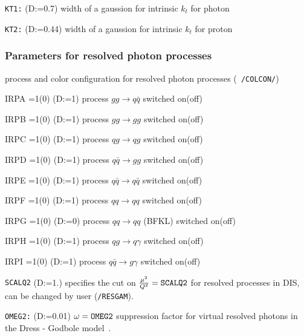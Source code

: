 \documentclass[10pt]{article} \usepackage{dina4}
\newcommand{\deflab}[1]{#1\hfil}%
\newenvironment{defl}[1]%
  {\begin{list}{}{\settowidth{\labelwidth}{#1}%
  \setlength{\leftmargin}{\labelwidth}%
  \addtolength{\leftmargin}{\labelsep}%
  \setlength{\itemsep}{0pt plus 1pt}
  \setlength{\parsep}{0pt plus 1pt}
  \setlength{\topsep}{0pt plus 1pt}
  \setlength{\partopsep}{0pt plus 1pt}
  \setlength{\parskip}{2mm plus 1mm minus 1mm}
  \let\makelabel\deflab}}%
  {\end{list}}
\begin{document}
\begin{defl}{123456789012345}
\item[{\tt KT1:}] 
(D:=0.7)  width of a gaussion for intrinsic $k_t$ for photon
 
\item[{\tt KT2:}] 
 (D:=0.44) width of a gaussion for intrinsic $k_t$ for proton

\end{defl}



\subsubsection{Parameters for resolved photon processes}
\begin{defl}{123456789012345}
\item[]  process and color configuration for 
                          resolved photon processes (\verb+ /COLCON/+)

\item[IRPA ] =1(0) 
(D:=1) process $gg \rightarrow q \bar{q}$ switched on(off)
\item[IRPB ] =1(0)
 (D:=1) process $ g g \rightarrow gg $  switched on(off)
\item[IRPC ] =1(0) 
(D:=1) process $ q g \rightarrow q g $ switched on(off)
\item[IRPD ] =1(0)
 (D:=1) process $ q \bar{q} \rightarrow g g $  switched on(off)
\item[IRPE ] =1(0)
 (D:=1) process $ q \bar{q} \rightarrow q \bar{q} $  switched on(off)
\item[IRPF ] =1(0)
 (D:=1) process $ q q \rightarrow q q $  switched on(off)
\item[IRPG ] =1(0) 
(D:=0) process $ q q \rightarrow q q $ (BFKL)  switched on(off)
\item[IRPH ] =1(0) 
(D:=1) process $ q g \rightarrow q \gamma $ switched on(off)
\item[IRPI ] =1(0)
 (D:=1) process $ q \bar{q} \rightarrow g \gamma $  switched on(off)

 
\item[{\tt SCALQ2}] (D:=1.) specifies the cut on 
$\frac{\mu^2}{Q^2}=\verb+SCALQ2+$ for resolved processes in DIS, can be
                      changed by user (\verb+/RESGAM+).


\item[{\tt OMEG2:}]
                   (D:=0.01)
                   $\omega=\verb+OMEG2+$ suppression factor for 
                   virtual resolved photons in the Dress - Godbole 
                   model~\cite{Drees_Godbole}.



\end{defl}
\end{document}
